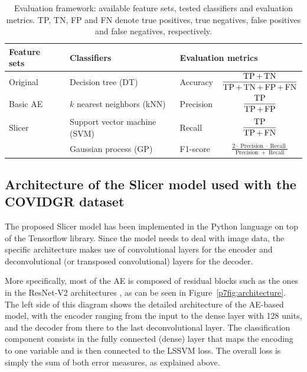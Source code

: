 \begin{table}[htbp]
    \centering
    \begin{tabular}{lllc}
    \toprule
         \bfseries Feature sets~~ &\bfseries Classifiers &  \multicolumn{2}{l}{\bfseries Evaluation metrics} \\\midrule
         Original&Decision tree (DT) & Accuracy& \(\displaystyle\frac{\operatorname{TP}+\operatorname{TN}}{\operatorname{TP}+\operatorname{TN}+\operatorname{FP}+\operatorname{FN}}\) \\
\addlinespace
         Basic AE&$k$ nearest neighbors (kNN) & Precision& \(\displaystyle\frac{\operatorname{TP}}{\operatorname{TP}+\operatorname{FP}}\) \\
\addlinespace
         Slicer&Support vector machine (SVM)~~ & Recall& \(\displaystyle\frac{\operatorname{TP}}{\operatorname{TP}+\operatorname{FN}}\) \\
\addlinespace
         &Gaussian process (GP) & F1-score& \(\displaystyle\frac{2\cdot\operatorname{Precision}\cdot\operatorname{Recall}}{\operatorname{Precision}+\operatorname{Recall}}\) \\
     \bottomrule
    \end{tabular}
    \caption{Evaluation framework: available feature sets, tested classifiers and evaluation metrics. TP, TN, FP and FN denote true positives, true negatives, false positives and false negatives, respectively.}
    \label{p7tab:eval}
\end{table}
\vspace{-1em} 

\subsection{Architecture of the Slicer model used with the COVIDGR dataset}

The proposed Slicer model has been implemented in the Python language on top of the Tensorflow \cite{tensorflow2015-whitepaper} library. Since the model needs to deal with image data, the specific architecture makes use of convolutional layers for the encoder and deconvolutional (or transposed convolutional) layers for the decoder.

More specifically, most of the AE is composed of residual blocks such as the ones in the ResNet-V2 architectures \cite{he2016identity}, as can be seen in Figure~\ref{p7fig:architecture}. The left side of this diagram shows the detailed architecture of the AE-based model, with the encoder ranging from the input to the dense layer with 128 units, and the decoder from there to the last deconvolutional layer. The classification component consists in the fully connected (dense) layer that maps the encoding to one variable and is then connected to the LSSVM loss. The overall loss is simply the sum of both error measures, as explained above. 

